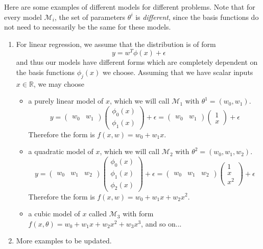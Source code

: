 \documentclass{article}
\begin{document}
    Here are some examples of different models for different problems. Note that for every model $\mathcal{M}_i$, the set of parameters $\theta^i$ is \textit{different}, since the basis functions do not need to necessarily be the same for these models.

    \begin{enumerate}
      \item For linear regression, we assume that the distribution is of form
      \begin{equation}
        y = w^T \phi(x) + \epsilon
      \end{equation}
      and thus our models have different forms which are completely dependent on the basis functions $\phi_j(x)$ we choose. Assuming that we have scalar inputs $x \in \mathbb{R}$, we may choose
      \begin{itemize}
        \item a purely linear model of $x$, which we will call $\mathcal{M}_1$ with $\theta^1 = (w_0, w_1)$.
        \begin{equation}
          y = \begin{pmatrix} w_0 & w_1 \end{pmatrix} \begin{pmatrix} \phi_0 (x) \\ \phi_1 (x) \end{pmatrix} + \epsilon = \begin{pmatrix} w_0 & w_1 \end{pmatrix} \begin{pmatrix} 1 \\ x \end{pmatrix} + \epsilon
        \end{equation}
        Therefore the form is $f(x, w) = w_0 + w_1 x$.

        \item a quadratic model of $x$, which we will call $\mathcal{M}_2$ with $\theta^2 = (w_0, w_1, w_2)$.
        \begin{equation}
          y = \begin{pmatrix} w_0 & w_1 & w_2 \end{pmatrix} \begin{pmatrix} \phi_0 (x) \\ \phi_1 (x) \\ \phi_2 (x) \end{pmatrix} + \epsilon = \begin{pmatrix} w_0 & w_1 & w_2 \end{pmatrix} \begin{pmatrix} 1 \\ x \\ x^2 \end{pmatrix} + \epsilon
        \end{equation}
        Therefore the form is $f(x, w) = w_0 + w_1 x + w_2 x^2$.

        \item a cubic model of $x$ called $\mathcal{M}_3$ with form $f(x, \theta) = w_0 + w_1 x + w_2 x^2 + w_3 x^3$, and so on...
      \end{itemize}
      \item More examples to be updated.
    \end{enumerate}
\end{document}
